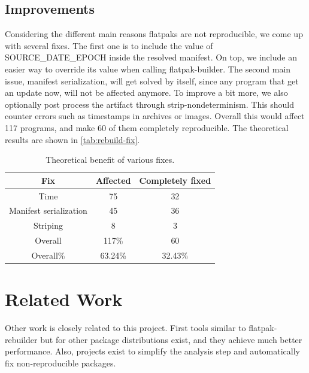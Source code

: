 \documentclass[a4paper,11pt,oneside]{report}
\theoremstyle{definition}
\newcommand{\sysname}{flatpak-rebuilder\xspace}
\newcommand{\fb}{flatpak-builder\xspace}
\newcommand{\sde}{SOURCE\_DATE\_EPOCH\xspace}
\begin{document}
\section{Improvements}
Considering the different main reasons flatpaks are not reproducible, we come
up with several fixes. The first one is to include the value of \sde inside the
resolved manifest. On top, we include an easier way to override its value when
calling \fb.
The second main issue, manifest serialization, will get solved by itself, since
any program that get an update now, will not be affected anymore.
To improve a bit more, we also optionally post process the artifact through
strip-nondeterminism. This should counter errors such as timestamps in archives
or images.
Overall this would affect 117 programs, and make 60 of them completely
reproducible. The theoretical results are shown in \autoref{tab:rebuild-fix}.

\begin{table}[h]
    \centering
        \begin{tabular}{|c|c|c|}
            \hline
            Fix & Affected & Completely fixed\\
            \hline
            Time & 75 & 32\\
            \hline
            Manifest serialization & 45 & 36 \\
            \hline
            Striping & 8 & 3\\
            \hline
            Overall & 117\% & 60\\
            \hline
            Overall\% & 63.24\% & 32.43\%\\
            \hline
        \end{tabular}
    \caption{Theoretical benefit of various fixes.}
    \label{tab:rebuild-fix}
\end{table}

\chapter{Related Work}
\label{chap:relw}

Other work is closely related to this project. First tools similar to \sysname
but for other package distributions exist, and they achieve much better
performance. Also, projects exist to simplify the analysis step and
automatically fix non-reproducible packages.
\end{document}
